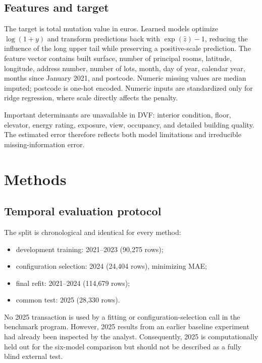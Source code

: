 \documentclass[11pt,a4paper]{article}
\begin{document}
\subsection{Features and target}

The target is total mutation value in euros. Learned models optimize
$\log(1+y)$ and transform predictions back with $\exp(\hat{z})-1$, reducing the
influence of the long upper tail while preserving a positive-scale prediction.
The feature vector contains built surface, number of principal rooms, latitude,
longitude, address number, number of lots, month, day of year, calendar year,
months since January 2021, and postcode. Numeric missing values are median
imputed; postcode is one-hot encoded. Numeric inputs are standardized only for
ridge regression, where scale directly affects the penalty.

Important determinants are unavailable in DVF: interior condition, floor,
elevator, energy rating, exposure, view, occupancy, and detailed building
quality. The estimated error therefore reflects both model limitations and
irreducible missing-information error.

\section{Methods}

\subsection{Temporal evaluation protocol}

The split is chronological and identical for every method:
\begin{itemize}
  \item development training: 2021--2023 (90,275 rows);
  \item configuration selection: 2024 (24,404 rows), minimizing MAE;
  \item final refit: 2021--2024 (114,679 rows);
  \item common test: 2025 (28,330 rows).
\end{itemize}

No 2025 transaction is used by a fitting or configuration-selection call in the
benchmark program. However, 2025 results from an earlier baseline experiment had
already been inspected by the analyst. Consequently, 2025 is computationally
held out for the six-model comparison but should not be described as a fully
blind external test.
\end{document}
